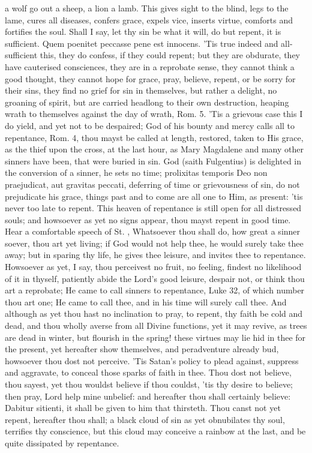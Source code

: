 {a wolf go out a sheep, a lion a lamb. This gives sight to the
blind, legs to the lame, cures all diseases, confers grace, expels
vice, inserts virtue, comforts and fortifies the soul. Shall I say, let
thy sin be what it will, do but repent, it is sufficient. Quem
poenitet peccasse pene est innocens. 'Tis true indeed and
all-sufficient this, they do confess, if they could repent; but they
are obdurate, they have cauterised consciences, they are in a reprobate
sense, they cannot think a good thought, they cannot hope for grace,
pray, believe, repent, or be sorry for their sins, they find no grief
for sin in themselves, but rather a delight, no groaning of spirit, but
are carried headlong to their own destruction, heaping wrath to
themselves against the day of wrath, Rom.  5. 'Tis a grievous case
this I do yield, and yet not to be despaired; God of his bounty and
mercy calls all to repentance, Rom.  4, thou mayst be called at
length, restored, taken to His grace, as the thief upon the cross, at
the last hour, as Mary Magdalene and many other sinners have been, that
were buried in sin. God (saith Fulgentius) is delighted in the
conversion of a sinner, he sets no time; prolixitas temporis Deo non
praejudicat, aut gravitas peccati, deferring of time or grievousness of
sin, do not prejudicate his grace, things past and to come are all one
to Him, as present: 'tis never too late to repent. This heaven of
repentance is still open for all distressed souls; and howsoever as yet
no signs appear, thou mayst repent in good time. Hear a comfortable
speech of St. \Austin{}, Whatsoever thou shall do, how great a
sinner soever, thou art yet living; if God would not help thee, he
would surely take thee away; but in sparing thy life, he gives thee
leisure, and invites thee to repentance. Howsoever as yet, I say, thou
perceivest no fruit, no feeling, findest no likelihood of it in
thyself, patiently abide the Lord's good leisure, despair not, or think
thou art a reprobate; He came to call sinners to repentance, Luke 
32, of which number thou art one; He came to call thee, and in his time
will surely call thee. And although as yet thou hast no inclination to
pray, to repent, thy faith be cold and dead, and thou wholly averse
from all Divine functions, yet it may revive, as trees are dead in
winter, but flourish in the spring! these virtues may lie hid in thee
for the present, yet hereafter show themselves, and peradventure
already bud, howsoever thou dost not perceive. 'Tis Satan's policy to
plead against, suppress and aggravate, to conceal those sparks of faith
in thee. Thou dost not believe, thou sayest, yet thou wouldst believe
if thou couldst, 'tis thy desire to believe; then pray, Lord help
mine unbelief: and hereafter thou shall certainly believe:
Dabitur sitienti, it shall be given to him that thirsteth. Thou
canst not yet repent, hereafter thou shall; a black cloud of sin as yet
obnubilates thy soul, terrifies thy conscience, but this cloud may
conceive a rainbow at the last, and be quite dissipated by repentance.

}
